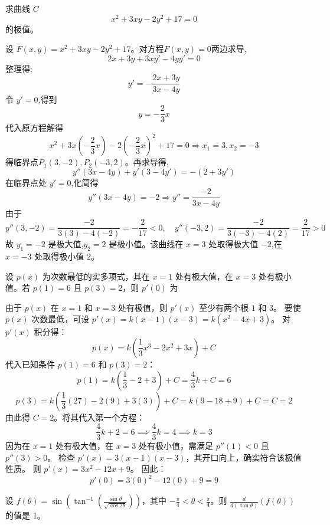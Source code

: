 \begin{questions}
    \question 求曲线 $C$ 
    \[
    x^2 + 3xy - 2y^2 + 17 = 0
    \]
    的极值。
    \begin{solution}
        设 $F(x, y) = x^2 + 3xy - 2y^2 + 17$。对方程$F(x, y)=0$两边求导,
        \[
        2x + 3y + 3x y' - 4y y' = 0
        \]
        整理得:
        \[
        y' = -\frac{2x + 3y}{3x - 4y}
        \]
        令 $y' = 0$,得到 
        \[
        y = -\frac{2}{3}x
        \]
        代入原方程解得
        \[
        x^2 + 3x\left(-\frac{2}{3}x\right) - 2\left(-\frac{2}{3}x\right)^2 + 17 = 0 \Rightarrow x_1 = 3, x_2 = -3
        \]
        得临界点$P_1(3, -2),P_2(-3, 2)$。再求导得,
        \[
        y'' (3x - 4y) + y' (3 - 4y') = -(2 + 3y')
        \]
        在临界点处 $y' = 0$,化简得
        \[
        y'' (3x - 4y) = -2 \Rightarrow y'' = \frac{-2}{3x - 4y}
        \]
        由于
        \[
        y''(3, -2) = \frac{-2}{3(3) - 4(-2)}= -\frac{2}{17} < 0, \quad y''(-3, 2) = \frac{-2}{3(-3) - 4(2)} = \frac{2}{17} > 0
        \]
        故 $y_1 = -2$ 是极大值,$y_2 = 2$ 是极小值。该曲线在 $x=3$ 处取得极大值 $-2$,在 $x=-3$ 处取得极小值 $2$。
    \end{solution}

    \question 设 $p(x)$ 为次数最低的实多项式，其在 $x = 1$ 处有极大值，在 $x = 3$ 处有极小值。若 $p(1) = 6$ 且 $p(3) = 2$，则 $p'(0)$ 为
\begin{solution}
由于 $p(x)$ 在 $x = 1$ 和 $x = 3$ 处有极值，则 $p'(x)$ 至少有两个根 $1$ 和 $3$。
要使 $p(x)$ 次数最低，可设 $p'(x) = k(x - 1)(x - 3) = k(x^2 - 4x + 3)$。
对 $p'(x)$ 积分得：
\[
p(x) = k\left( \frac{1}{3}x^3 - 2x^2 + 3x \right) + C
\]
代入已知条件 $p(1) = 6$ 和 $p(3) = 2$：
\[
p(1) = k\left( \frac{1}{3} - 2 + 3 \right) + C = \frac{4}{3}k + C = 6
\]
\[
p(3) = k\left( \frac{1}{3}(27) - 2(9) + 3(3) \right) + C = k(9 - 18 + 9) + C = C = 2
\]
由此得 $C = 2$。将其代入第一个方程：
\[
\frac{4}{3}k + 2 = 6 \implies \frac{4}{3}k = 4 \implies k = 3
\]
因为在 $x=1$ 处有极大值，在 $x=3$ 处有极小值，需满足 $p''(1) < 0$ 且 $p''(3) > 0$。
检查 $p'(x) = 3(x-1)(x-3)$，其开口向上，确实符合该极值性质。
则 $p'(x) = 3x^2 - 12x + 9$。
因此：
\[
p'(0) = 3(0)^2 - 12(0) + 9 = 9
\]
\end{solution}

\question 设 $f(\theta) = \sin \left( \tan^{-1} \left( \frac{\sin \theta}{\sqrt{\cos 2\theta}} \right) \right)$，其中 $-\frac{\pi}{4} < \theta < \frac{\pi}{4}$。则 $\frac{d}{d(\tan \theta)} (f(\theta))$ 的值是 1。


\end{questions}

